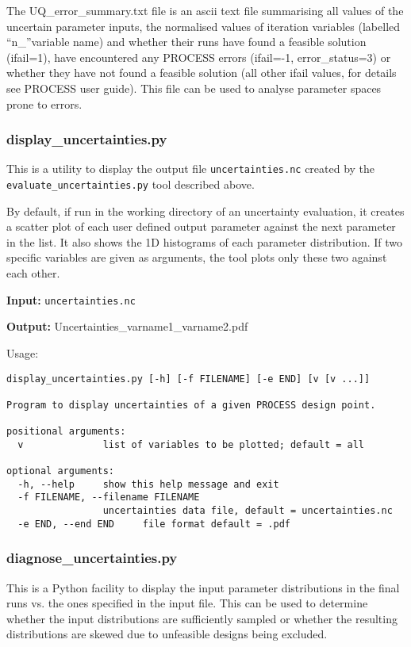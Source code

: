 \documentclass[11pt,a4paper]{article}
\begin{document}
The UQ\_error\_summary.txt file is an ascii text file summarising all values of the uncertain parameter inputs, the normalised values of iteration variables (labelled ``n\_''variable name) and whether their runs have found a feasible solution (ifail=1), have encountered any PROCESS errors (ifail=-1, error\_status=3) or whether they have not found a feasible solution (all other ifail values, for details see PROCESS user guide). This file can be used to analyse parameter spaces prone to errors.



\subsubsection{display\_uncertainties.py}

This is a utility to display the output file \texttt{uncertainties.nc} created by the \texttt{evaluate\_uncertainties.py} tool described above.

By default, if run in the working directory of an uncertainty evaluation, it creates a scatter plot of each user defined output parameter against the next parameter in the list.  It also shows the 1D histograms of each parameter distribution. If two specific variables are given as arguments, the tool plots only these two against each other.

\begin{description}
\item{\textbf{Input:}}
 \texttt{uncertainties.nc}

\item{\textbf{Output:}}
Uncertainties\_varname1\_varname2.pdf
\end{description}

Usage:
\begin{verbatim}
display_uncertainties.py [-h] [-f FILENAME] [-e END] [v [v ...]]

Program to display uncertainties of a given PROCESS design point.

positional arguments:
  v              list of variables to be plotted; default = all

optional arguments:
  -h, --help     show this help message and exit
  -f FILENAME, --filename FILENAME
                 uncertainties data file, default = uncertainties.nc
  -e END, --end END     file format default = .pdf
\end{verbatim}


\subsubsection{diagnose\_uncertainties.py}
This is a Python facility to display the input parameter distributions in the final runs vs. the ones specified in the input file. This can be used to determine whether the input distributions are sufficiently sampled or whether the resulting distributions are skewed due to unfeasible designs being excluded.
\end{document}
